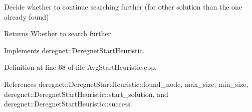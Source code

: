Decide whether to continue searching further (for other solution than the one already found) 

\begin{DoxyReturn}{Returns}
Whether to search further 
\end{DoxyReturn}


Implements \hyperlink{classderegnet_1_1DeregnetStartHeuristic_ac3ee2c3022512f9d4ec7a6b49358e60a}{deregnet\+::\+Deregnet\+Start\+Heuristic}.



Definition at line 68 of file Avg\+Start\+Heuristic.\+cpp.



References deregnet\+::\+Deregnet\+Start\+Heuristic\+::found\+\_\+node, max\+\_\+size, min\+\_\+size, deregnet\+::\+Deregnet\+Start\+Heuristic\+::start\+\_\+solution, and deregnet\+::\+Deregnet\+Start\+Heuristic\+::success.


